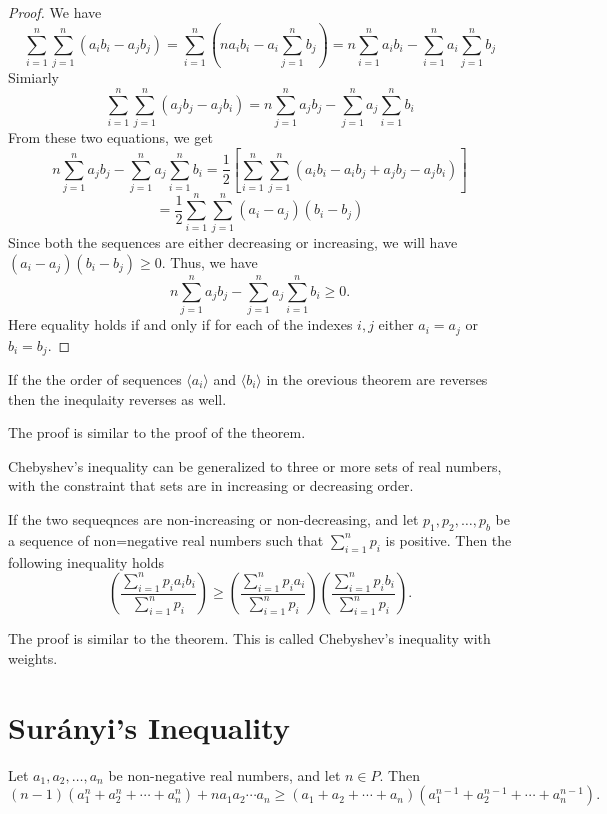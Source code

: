 \begin{proof}
  We have $$\sum_{i=1}^n\sum_{j=1}^n(a_ib_i - a_jb_j) = \sum_{i=1}^n\left(na_ib_i - a_i\sum_{j=1}^nb_j\right) =
  n\sum_{i=1}^na_ib_i - \sum_{i=1}^na_i\sum_{j=1}^nb_j$$
  Simiarly
  $$\sum_{i=1}^n\sum_{j=1}^n\left(a_jb_j - a_jb_i\right) = n\sum_{j=1}^na_jb_j - \sum_{j=1}^na_j\sum_{i=1}^nb_i$$
  From these two equations, we get
  $$n\sum_{j=1}^na_jb_j - \sum_{j=1}^na_j\sum_{i=1}^nb_i = \frac{1}{2}\left[\sum_{i=1}^n\sum_{j=1}^n\left(a_ib_i - a_ib_j + a_jb_j
    - a_jb_i\right)\right]$$
  $$= \frac{1}{2}\sum_{i=1}^n\sum_{j=1}^n(a_i - a_j)(b_i - b_j)$$
  Since both the sequences are either decreasing or increasing, we will have $(a_i - a_j)(b_i - b_j)\geq 0$. Thus, we have
  $$n\sum_{j=1}^na_jb_j - \sum_{j=1}^na_j\sum_{i=1}^nb_i \geq 0.$$
  Here equality holds if and only if for each of the indexes $i, j$ either $a_i = a_j$ or $b_i = b_j$.
\end{proof}

\begin{remark}
  If the the order of sequences $\langle a_i\rangle$ and $\langle b_i\rangle$ in the orevious theorem are reverses then the
  inequlaity reverses as well.

  {\rm The proof is similar to the proof of the theorem.}
\end{remark}

\begin{remark}
  Chebyshev's inequality can be generalized to three or more sets of real numbers, with the constraint that sets are in increasing
  or decreasing order.
\end{remark}

\begin{remark}
  If the two sequeqnces are non-increasing or non-decreasing, and let $p_1, p_2, \ldots, p_b$ be a sequence of non=negative real
  numbers such that $\sum_{i=1}^np_i$ is positive. Then the following inequality holds
  $$\left(\frac{\sum_{i=1}^np_ia_ib_i}{\sum_{i=1}^np_i}\right)\geq\left(\frac{\sum_{i=1}^np_ia_i}{\sum_{i=1}^np_i}\right)\left(\frac{\sum_{i=1}^np_ib_i}{\sum_{i=1}^np_i}\right).$$

  {\rm The proof is similar to the theorem. This is called Chebyshev's inequality with weights.}
\end{remark}

\section{Sur\'anyi's Inequality}
\begin{theorem}
  Let $a_1, a_2, \ldots, a_n$ be non-negative real numbers, and let $n\in P$. Then
  \begin{equation}
    (n - 1)(a_1^n + a_2^n + \cdots + a_n^n) + na_1a_2 \cdots a_n\geq (a_1 + a_2 + \cdots + a_n)(a_1^{n-1} + a_2^{n - 1} + \cdots + a_n^{n-1}).
  \end{equation}
\end{theorem}

